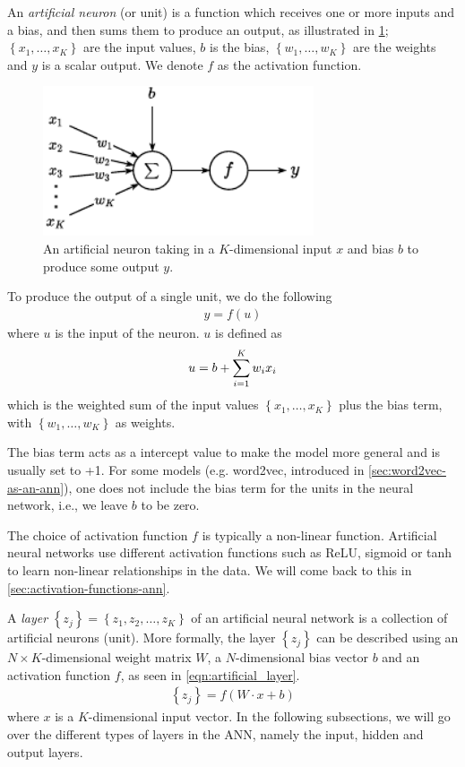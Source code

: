 An \textit{artificial neuron} (or unit) is a function which receives one or more inputs and a bias, and then sums them to produce an output, as illustrated in \cref{fig:artificial_neuron}; $\left\{ x_1, \ldots, x_K \right\}$ are the input values, $b$ is the bias, $\left\{ w_1, \ldots, w_K \right\}$ are the weights and $y$ is a scalar output. We denote $f$ as the activation function.
\begin{figure}[H]
    \centering
    \includegraphics[width=8cm]{thesis/figures/artificial-neuron_cropped.pdf}
    \caption{An artificial neuron taking in a $K$-dimensional input $x$ and bias $b$ to produce some output $y$.}
    \label{fig:artificial_neuron}
\end{figure}

To produce the output of a single unit, we do the following
\begin{align}
    y = f(u)
\end{align}
where $u$ is the input of the neuron. $u$ is defined as
\begin{align}
    u = b + \sum\limits_{i=1}^{K} w_i x_i
\end{align}
which is the weighted sum of the input values $\left\{ x_1, \ldots, x_K \right\}$ plus the bias term, with $\left\{ w_1, \ldots, w_K \right\}$ as weights.

The bias term acts as a intercept value to make the model more general and is usually set to +1. For some models (e.g. word2vec, introduced in \cref{sec:word2vec-as-an-ann}), one does not include the bias term for the units in the neural network, i.e., we leave $b$ to be zero.

The choice of activation function $f$ is typically a non-linear function. Artificial neural networks use different activation functions such as ReLU, sigmoid or tanh to learn non-linear relationships in the data. We will come back to this in \cref{sec:activation-functions-ann}.

\newcommand{\layer}[2]{\left\{ {#1}_{#2} \right\}}

A \textit{layer} $\layer{z}{j} = \left\{ z_1, z_2, \ldots, z_K \right\}$ of an artificial neural network is a collection of artificial neurons (unit). More formally, the layer $\layer{z}{j}$ can be described using an $N \times K$-dimensional weight matrix $W$, a $N$-dimensional bias vector $b$ and an activation function $f$, as seen in \cref{eqn:artificial_layer}.
\begin{align}
    \layer{z}{j} = f \left( W \cdot x + b \right)
    \label{eqn:artificial_layer}
\end{align}
where $x$ is a $K$-dimensional input vector. In the following subsections, we will go over the different types of layers in the ANN, namely the input, hidden and output layers.


